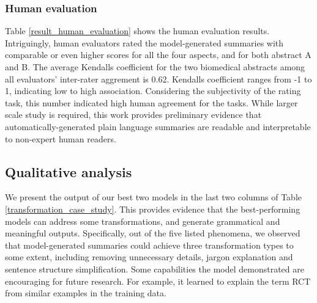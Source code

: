 \documentclass[letterpaper, table]{article} %
\begin{document}
\subsubsection{Human evaluation}
Table \ref{result_human_evaluation} shows the human evaluation results. Intriguingly, human evaluators rated the model-generated summaries with comparable or even higher scores for all the four aspects, and for both abstract A and B. The average Kendalls coefficient \cite{sen1968estimates} for the two biomedical abstracts among all evaluators' inter-rater aggrement is 0.62. Kendalls coefficient ranges from -1 to 1, indicating low to high association. Considering the subjectivity of the rating task, this number indicated high human agreement for the tasks. 
While larger scale study is required,
this work provides preliminary evidence that automatically-generated plain language summaries
are readable and interpretable to non-expert human readers.
\subsection{Qualitative analysis}
We present the output of our best two models in the last two columns of Table \ref{transformation_case_study}. 
This provides evidence that the best-performing models can address some transformations, and generate grammatical and meaningful outputs. 
Specifically, out of the five listed phenomena, we observed that model-generated summaries could achieve three transformation types to some extent, including removing unnecessary details, jargon explanation and sentence structure simplification. 
Some capabilities the model demonstrated are encouraging for future research. 
For example, it learned to explain the term RCT from similar examples in the training data.
\end{document}
